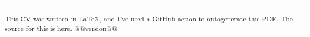 \documentclass[10pt,a4paper]{article}
\begin{document}
\hrule
\vspace{-0.2em}

\begin{description*}
	\item
	\textsubscript{This CV was written in \LaTeX, and I've used a GitHub action to autogenerate this PDF. The source for this is  \href{https://github.com/robert-will-brown/cv}{here}.  @@version@@}

\end{description*}
\end{document}
